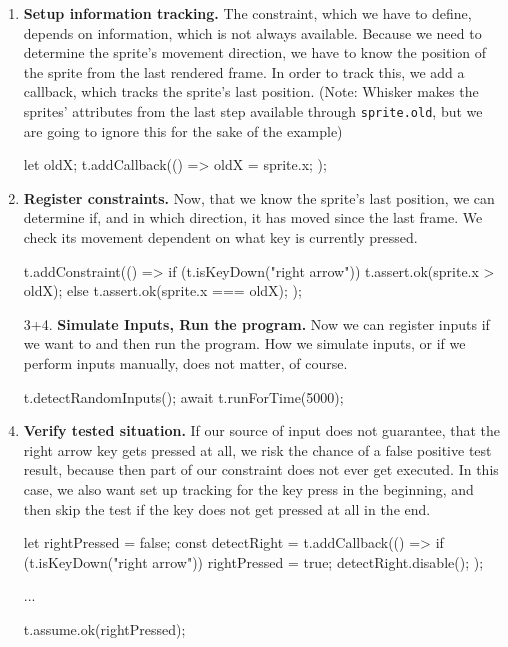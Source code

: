 \begin{enumerate}
    \item \textbf{Setup information tracking.}
        The constraint, which we have to define, depends on information, which is not always available.
        Because we need to determine the sprite's movement direction, we have to know the position of the sprite from the last rendered frame.
        In order to track this, we add a callback, which tracks the sprite's last position.
        (Note: Whisker makes the sprites' attributes from the last step available through \texttt{sprite.old}, but we are going to ignore this for the sake of the example)
        \begin{javascriptcode}
            let oldX;
            t.addCallback(() => {
                oldX = sprite.x;
            });
        \end{javascriptcode}
    \item \textbf{Register constraints.}
        Now, that we know the sprite's last position, we can determine if, and in which direction, it has moved since the last frame.
        We check its movement dependent on what key is currently pressed.
        \begin{javascriptcode}
            t.addConstraint(() => {
                if (t.isKeyDown("right arrow")) {
                    t.assert.ok(sprite.x > oldX);
                } else {
                    t.assert.ok(sprite.x === oldX);
                }
            });
        \end{javascriptcode}
    \item[3+4.] \textbf{Simulate Inputs, Run the program.}
        \setcounter{enumi}{4}
        Now we can register inputs if we want to and then run the program.
        How we simulate inputs, or if we perform inputs manually, does not matter, of course.
        \begin{javascriptcode}
            t.detectRandomInputs();
            await t.runForTime(5000);
        \end{javascriptcode}
    \item \textbf{Verify tested situation.}
        If our source of input does not guarantee, that the right arrow key gets pressed at all, we risk the chance of a false positive test result,
        because then part of our constraint does not ever get executed.
        In this case, we also want set up tracking for the key press in the beginning,
        and then skip the test if the key does not get pressed at all in the end.
        \begin{javascriptcode}
            let rightPressed = false;
            const detectRight = t.addCallback(() => {
                if (t.isKeyDown("right arrow")) {
                    rightPressed = true;
                    detectRight.disable();
                }
            });

            ...

            t.assume.ok(rightPressed);
        \end{javascriptcode}
\end{enumerate}

